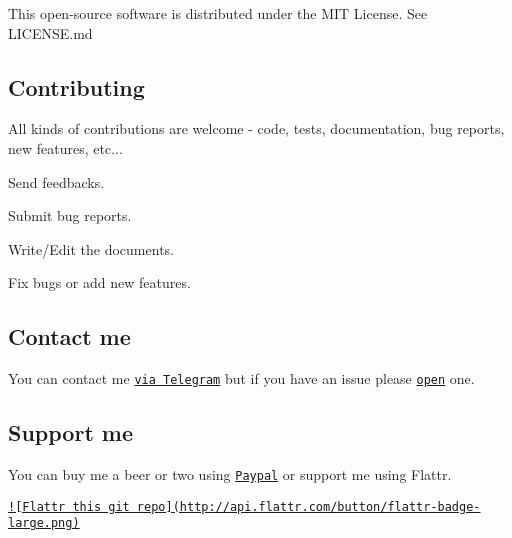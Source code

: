 This open-\/source software is distributed under the M\-I\-T License. See L\-I\-C\-E\-N\-S\-E.\-md

\subsection*{Contributing }

All kinds of contributions are welcome -\/ code, tests, documentation, bug reports, new features, etc...


\begin{DoxyItemize}
\item Send feedbacks.
\item Submit bug reports.
\item Write/\-Edit the documents.
\item Fix bugs or add new features.
\end{DoxyItemize}

\subsection*{Contact me }

You can contact me \href{https://telegram.me/ggrillo}{\tt via Telegram} but if you have an issue please \href{https://github.com/Eleirbag89/TelegramBotPHP/issues}{\tt open} one.

\subsection*{Support me }

You can buy me a beer or two using \href{https://paypal.me/eleirbag89}{\tt Paypal} or support me using Flattr.

\href{https://flattr.com/submit/auto?user_id=eleirbag89&url=https://github.com/Eleirbag89/TelegramBotPHP&title=TelegramBotPHP&language=&tags=github&category=software}{\tt !\mbox{[}Flattr this git repo\mbox{]}(http\-://api.\-flattr.\-com/button/flattr-\/badge-\/large.\-png)} 